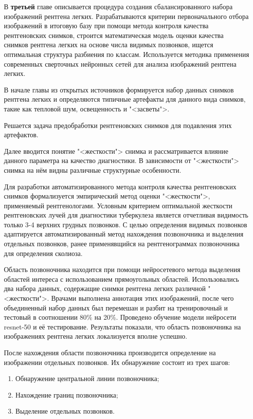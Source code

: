 В {\textbf{третьей}} главе описывается процедура создания сбалансированного набора изображений рентгена легких. Разрабатываются критерии первоначального отбора изображений в итоговую базу при помощи метода контроля качества рентгеновских снимков, строится математическая модель оценки качества снимков рентгена легких на основе числа видимых позвонков, ищется оптимальная структура разбиения по классам. Используется методика применения современных сверточных нейронных сетей для анализа изображений рентгена легких.

В начале главы из открытых источников формируется набор данных снимков рентгена легких и определяются типичные артефакты для данного вида снимков, такие как тепловой шум, освещенность и "<засветы">.

Решается задача предобработки рентгеновских снимков для подавления этих артефактов. 
 
Далее вводится понятие "<жесткости"> снимка и рассматривается влияние данного параметра на качество диагностики. В зависимости от  "<жесткости"> снимка на нём видны различные структурные особенности.

Для разработки автоматизированного метода контроля качества рентгеновских снимков формализуется эмпирический метод оценки  "<жесткости">, применяемый рентгенологами. Условным критерием оптимальной жесткости рентгеновских лучей для диагностики туберкулеза является отчетливая видимость только 3-4 верхних грудных позвонков. С целью определения видимых позвонков адаптируется автоматизированный метод нахождения позвоночника и выделения отдельных позвонков, ранее применявщийся на рентгенограммах позвоночника для определения сколиоза.

Область позвоночника находится при помощи нейросетевого метода выделения областей интереса с использованием прямоугольных областей. Использовались два набора данных, содержащие снимки рентгена легких различной  "<жесткости">. Врачами выполнена аннотация этих изображений, после чего объединенный набор данных был перемешан и разбит на тренировочный и тестовый в соотношении 80\% на 20\%. Проведено обучение модели нейросети resnet-50 и её тестирование. Результаты показали, что область позвоночника на изображениях рентгена легких локализуется вполне успешно.

После нахождения области позвоночника производится определение на изображении отдельных позвонков. Их обнаружение состоит из трех шагов:

\begin{enumerate}
\item Обнаружение центральной линии позвоночника;
\item Нахождение границ позвоночника;
\item Выделение отдельных позвонков.
\end{enumerate}

